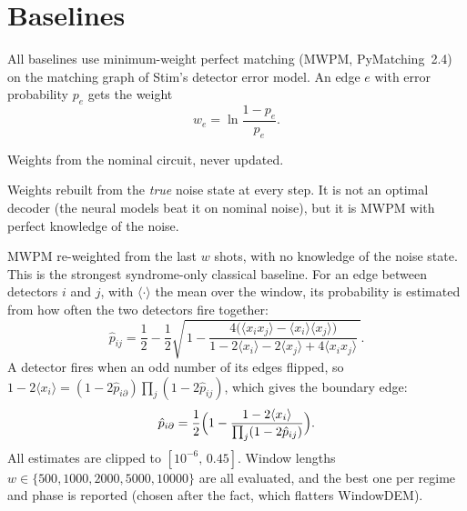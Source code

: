 \documentclass[11pt,a4paper]{article}
\begin{document}
\section{Baselines}\label{sec:baselines}

All baselines use minimum-weight perfect matching (MWPM, PyMatching~2.4) on the matching graph of Stim's
detector error model. An edge $e$ with error probability $p_e$ gets the weight
\begin{equation}
  w_e = \ln\frac{1-p_e}{p_e}.
\end{equation}
\begin{description}[leftmargin=1.2em, labelindent=0em]
\item[Static MWPM] Weights from the nominal circuit, never updated.
\item[Oracle MWPM] Weights rebuilt from the \emph{true} noise state at every step. It is not an optimal
  decoder (the neural models beat it on nominal noise), but it is MWPM with perfect knowledge of the noise.
\item[WindowDEM] MWPM re-weighted from the last $w$ shots, with no knowledge of the noise state. This is
  the strongest syndrome-only classical baseline. For an edge between detectors $i$ and $j$, with
  $\langle\cdot\rangle$ the mean over the window, its probability is estimated from how often the two
  detectors fire together:
  \begin{equation}
    \hat p_{ij} = \frac12 - \frac12\sqrt{\,1 - \frac{4\bigl(\langle x_ix_j\rangle - \langle x_i\rangle\langle x_j\rangle\bigr)}
    {1 - 2\langle x_i\rangle - 2\langle x_j\rangle + 4\langle x_ix_j\rangle}\,}.
  \end{equation}
  A detector fires when an odd number of its edges flipped, so
  $1 - 2\langle x_i\rangle = (1-2\hat p_{i\partial})\prod_{j}(1-2\hat p_{ij})$, which gives the boundary edge:
  \begin{equation}
    \hat p_{i\partial} = \frac12\Bigl(1 - \frac{1-2\langle x_i\rangle}{\prod_{j}(1-2\hat p_{ij})}\Bigr).
  \end{equation}
  All estimates are clipped to $[10^{-6},\,0.45]$. Window lengths $w\in\{500,1000,2000,5000,10000\}$ are all
  evaluated, and the best one per regime and phase is reported (chosen after the fact, which flatters WindowDEM).
\end{description}

\end{document}
